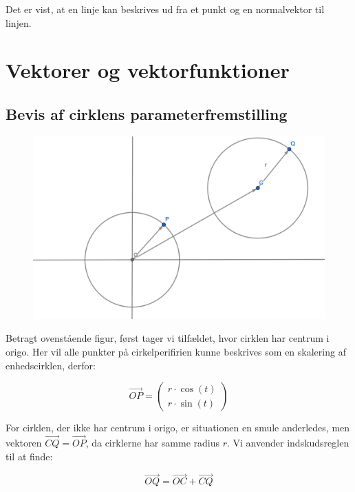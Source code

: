 \documentclass{article}
\makeatletter
\newenvironment{proofw}{\par
  \pushQED{\qed}%
  \normalfont \topsep6\p@\@plus6\p@\relax
  \trivlist
  \item[]\ignorespaces
}{%
  \popQED\endtrivlist\@endpefalse
}
\makeatother
\begin{document}
\begin{proofw}
    Det er vist, at en linje kan beskrives ud fra et punkt og en normalvektor til linjen.

\end{proofw}

\section{Vektorer og vektorfunktioner}

\subsection{Bevis af cirklens parameterfremstilling}

\begin{proofw}
    \begin{figure}[h]
        \centering
        \includegraphics[scale=0.3]{skitser/cirkel.png}
    \end{figure}

    Betragt ovenstående figur, først tager vi tilfældet,
    hvor cirklen har centrum i origo. Her vil alle punkter
    på cirkelperifirien kunne beskrives som en skalering af enhedscirklen, derfor:

    $$
        \vec{OP}=\begin{pmatrix}
            r\cdot \cos(t)
            \\
            r\cdot \sin(t)
        \end{pmatrix}
    $$
    
    For cirklen, der ikke har centrum i origo, er situationen en smule anderledes,
    men vektoren $\vec{CQ}=\vec{OP}$, da cirklerne har samme radius $r$.
    Vi anvender indskudsreglen til at finde:

    $$
        \vec{OQ}=\vec{OC}+\vec{CQ}
    $$


\end{proofw}
\end{document}
